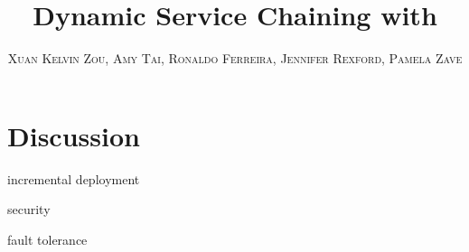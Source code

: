 \documentclass{sig-alternate-10pt}
\title{\LARGE\textbf{Dynamic Service Chaining with \system}}
\author{\textsc{Xuan Kelvin Zou, Amy Tai, Ronaldo Ferreira, Jennifer Rexford, Pamela Zave} }
\begin{document}
\maketitle  
\begin{comment}
\begin{abstract}
In addition to delivering data efficiently, today's computer networks often perform services on the traffic in flight to provide new features, enhance security, privacy, or performance. Network administrators frequently install so-called ``middleboxes'' such as firewalls, network address translators, server load balancers, Web caches, and devices that compress or encrypt the traffic. Recent trends of Network Functions Virtualization (NFV) and Software Defined Networks (SDN) turn the network into a fungible pool of resource for running services and steering traffic. Based on a NFV setting, we propose an optimization solution. More specifically, we introduce and study a new class of multi-commodify flow problems where in addition to demands on flows and capacity constraints on edges, there is an additional requirement that flows be processed by middleboxes in the network. 

Current techniques for getting middleboxes ``on path" rely on manipulating how the network switches route traffic. However due to flow session affinity and routing policy conflicts, tweaking the routing configuration to comply with a network is clumsy and inefficient. To achieve the routing solution we obtain from the optimization scheme, we propose a middlebox-aware session protocol (MBP) that makes middleboxes an explicit part of the end-to-end path, and adds, removes or replaces middleboxes dynamically as needed. This approach is easiest to achieve in a cloud environment, where---not coincidentally--the need for scalable NFV is greatest. 
\end{abstract}

\end{comment}











\section{Discussion}
\label{sec:discussion}

incremental deployment

security

fault tolerance





\small



\end{document}
